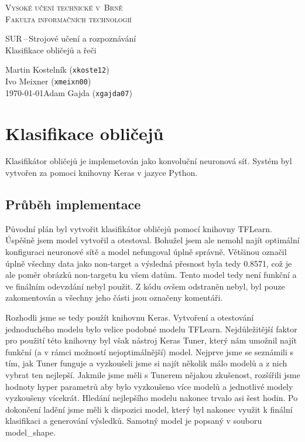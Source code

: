 \documentclass[a4paper,11pt]{article}
\begin{document}
	\begin{titlepage}
		\begin{center}
			\textsc{\Huge Vysoké učení technické v~Brně\\
				\vspace{0.4em}\huge Fakulta informačních technologií}
			
			
			{\LARGE SUR\,--\,Strojové učení a rozpoznávání\\
				\Huge Klasifikace obličejů a řeči\\ \vspace{0.3em}}
			
			
			{\Large \hfill Martin Kostelník (\texttt{xkoste12})}\\
			{\Large \hfill Ivo Meixner (\texttt{xmeixn00})}\\
			{\Large \today \hfill Adam Gajda (\texttt{xgajda07})}
		\end{center}
	\end{titlepage}

	\section{Klasifikace obličejů}

		Klasifikátor obličejů je implemetován jako konvoluční neuronová síť. Systém byl vytvořen za pomoci knihovny Keras v jazyce Python.

		\subsection {Průběh implementace}
			Původní plán byl vytvořit klasifikátor obličejů pomocí knihovny TFLearn. Úspěšně jsem model vytvořil a otestoval. Bohužel jsem ale nemohl najít optimální konfiguraci neuronové sítě a model nefungoval úplně správně. Většinou označil úplně všechny data jako non-target a výsledná přesnost byla tedy 0.8571, což je ale poměr obrázků non-targetu ku všem datům. Tento model tedy není funkční a ve finálním odevzdání nebyl použit. Z kódu ovšem odstraněn nebyl, byl pouze zakomentován a všechny jeho části jsou označeny komentáři.
			
			\vspace{10pt}
			
			Rozhodli jsme se tedy použít knihovnu Keras. Vytvoření a otestování jednoduchého modelu bylo velice podobné modelu TFLearn. Nejdůležitější faktor pro použití této knihovny byl však nástroj Keras Tuner, který nám umožnil najít funkční (a v rámci možností nejoptimálnější) model. Nejprve jsme se seznámili s tím, jak Tuner funguje a vyzkoušeli jsme si najít několik málo modelů a z nich vybrat ten nejlepší. Jakmile jsme měli s Tunerem nějakou zkušenost, rozšířili jsme hodnoty hyper parametrů aby bylo vyzkoušeno více modelů a jednotlivé modely vyzkoušeny vícekrát. Hledání nejlepšího modelu nakonec trvalo asi šest hodin. Po dokončení ladění jsme měli k dispozici model, který byl nakonec využit k finální klasifikaci a generování výsledků. Samotný model je popsaný v souboru model\_shape.
			
\end{document}

